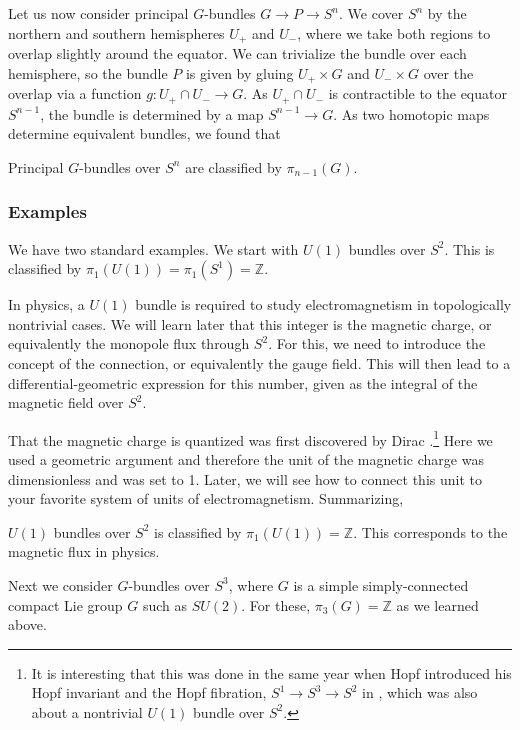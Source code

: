 \documentclass[12pt]{article}
\numberwithin{equation}{section}
\def\bZ{\mathbb{Z}}
\begin{document}
Let us now consider principal $G$-bundles  $G\to P\to S^n$.
We cover $S^n$ by the northern and southern hemispheres $U_+$ and $U_-$,
where we take both regions to overlap slightly around the equator.
We can trivialize the bundle over each hemisphere,
so the bundle $P$ is given by gluing
$U_+\times G$ and $U_-\times G$ over the overlap via a function
$g:U_+\cap U_-\to G$.
As $U_+\cap U_-$ is contractible to the equator $S^{n-1}$,
the bundle is determined by a map $S^{n-1} \to G$.
As two homotopic maps determine equivalent bundles,
we found that 
\begin{proposition}
  Principal $G$-bundles over $S^n$ are classified by $\pi_{n-1}(G)$.
\end{proposition}  

\subsubsection{Examples}

We have two standard examples. We start with 
$U(1)$ bundles over $S^2$.
This is classified by $\pi_1(U(1))=\pi_1(S^1)=\bZ$.

In physics, a $U(1)$ bundle is required to study electromagnetism
in topologically nontrivial cases.
We will learn later that this integer is the magnetic charge,
or equivalently the monopole flux through $S^2$.
For this, we need to introduce the concept of the connection, 
or equivalently the gauge field.
This will then lead to a differential-geometric expression for this number,
given as the integral of the magnetic field over $S^2$.

That the magnetic charge is quantized was first discovered by Dirac \cite{Dirac}.\footnote{%
It is interesting that this was done in the same year when Hopf introduced
his Hopf invariant and the Hopf fibration, $S^1\to S^3\to S^2$ in \cite{Hopf},
which was also about a nontrivial $U(1)$ bundle over $S^2$.}
Here we used a geometric argument and therefore the unit of the magnetic charge was dimensionless and was set to 1.
Later, we will see how to connect this unit to your favorite system of units of electromagnetism.
Summarizing, 
\begin{example}
$U(1)$ bundles over $S^2$ is classified by $\pi_1(U(1))=\bZ$.
This corresponds to the magnetic flux in physics.
\end{example}


Next we consider $G$-bundles over $S^3$,
where $G$ is a simple simply-connected compact Lie group $G$ such as $SU(2)$.
For these, $\pi_3(G)=\bZ$  as we learned above.
\end{document}
